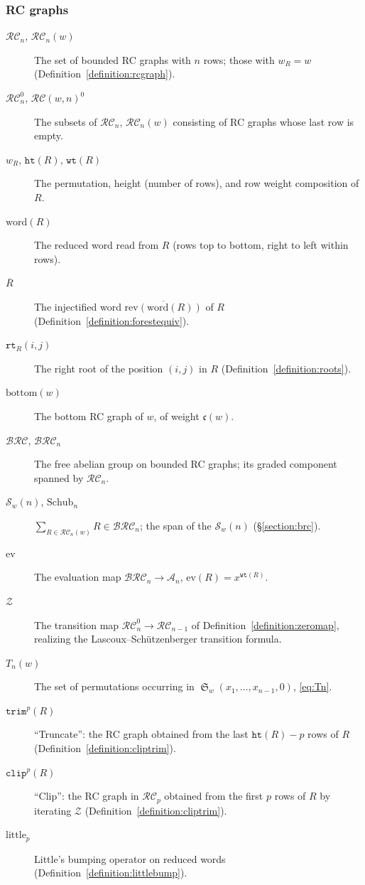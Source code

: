 \documentclass[pdflatex,sn-mathphys-num]{sn-jnl}
\numberwithin{equation}{subsection}
\DeclareMathOperator{\sch}{\mathfrak{S}}
\newcommand{\wof}[1]{w_{#1}}
\newcommand{\wtt}{\mathtt{wt}}
\newcommand{\rtt}{\mathtt{rt}}
\newcommand{\trm}{\mathtt{trim}}
\newcommand{\zeromap}{\mathcal{Z}}
\newcommand{\hr}{\mathtt{ht}}
\newcommand{\clp}{\mathtt{clip}}
\newcommand{\BRC}{\mathcal{BRC}}
\newcommand{\RC}{\mathcal{RC}}
\newcommand{\ltb}{\mathrm{little}}
\newcommand{\coma}{\mathcal{A}}
\newcommand{\code}{\mathfrak{c}}
\theoremstyle{thmstyleone}
\theoremstyle{thmstylethree}
\theoremstyle{thmstyletwo}
\begin{document}
\begin{appendices}
\subsubsection*{RC graphs}
\begin{description}
\item[$\RC_n$, $\RC_n(w)$] The set of bounded RC graphs with $n$ rows; those with $\wof{R}=w$ (Definition~\ref{definition:rcgraph}).
\item[$\RC_n^0$, $\RC(w,n)^0$] The subsets of $\RC_n$, $\RC_n(w)$ consisting of RC graphs whose last row is empty.
\item[$\wof{R}$, $\hr(R)$, $\wtt(R)$] The permutation, height (number of rows), and row weight composition of $R$.
\item[$\mathrm{word}(R)$] The reduced word read from $R$ (rows top to bottom, right to left within rows).
\item[$\overline{R}$] The injectified word $\overline{\mathrm{rev}(\mathrm{word}(R))}$ of $R$ (Definition~\ref{definition:forestequiv}).
\item[$\rtt_R(i,j)$] The right root of the position $(i,j)$ in $R$ (Definition~\ref{definition:roots}).
\item[$\mathrm{bottom}(w)$] The bottom RC graph of $w$, of weight $\code(w)$.
\item[$\BRC$, $\BRC_n$] The free abelian group on bounded RC graphs; its graded component spanned by $\RC_n$.
\item[$\mathcal{S}_w(n)$, $\mathrm{Schub}_n$] $\sum_{R\in\RC_n(w)}R\in\BRC_n$; the span of the $\mathcal{S}_w(n)$ (\S\ref{section:brc}).
\item[$\mathrm{ev}$] The evaluation map $\BRC_n\to\coma_n$, $\mathrm{ev}(R)=x^{\wtt(R)}$.
\item[$\zeromap$] The transition map $\RC_n^0\to\RC_{n-1}$ of Definition~\ref{definition:zeromap}, realizing the Lascoux--Sch\"utzenberger transition formula.
\item[$T_n(w)$] The set of permutations occurring in $\sch_w(x_1,\ldots,x_{n-1},0)$, \eqref{eq:Tn}.
\item[$\trm^p(R)$] ``Truncate'': the RC graph obtained from the last $\hr(R)-p$ rows of $R$ (Definition~\ref{definition:cliptrim}).
\item[$\clp^p(R)$] ``Clip'': the RC graph in $\RC_p$ obtained from the first $p$ rows of $R$ by iterating $\zeromap$ (Definition~\ref{definition:cliptrim}).
\item[$\ltb_p$] Little's bumping operator on reduced words (Definition~\ref{definition:littlebump}).
\end{description}


\end{appendices}
\end{document}
